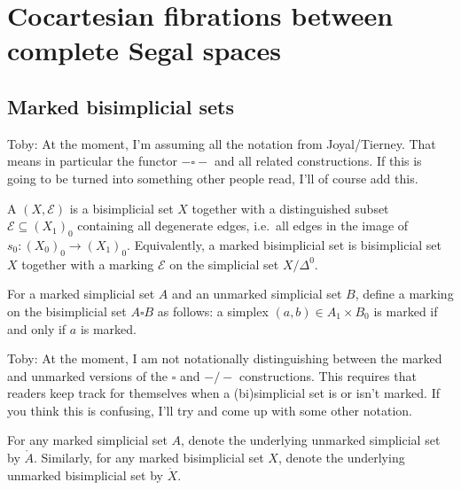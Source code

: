 \documentclass[main.tex]{subfiles}
\begin{document}
\section{Cocartesian fibrations between complete Segal spaces}
\label{sec:cocartesian_fibrations_between_complete_segal_spaces}

\subsection{Marked bisimplicial sets}
\label{ssc:marked_bisimplicial_sets}

\begin{note}
  Toby: At the moment, I'm assuming all the notation from Joyal/Tierney. That means in particular the functor $-\square-$ and all related constructions. If this is going to be turned into something other people read, I'll of course add this.
\end{note}

\begin{definition}
  A  $(X, \mathcal{E})$ is a bisimplicial set $X$ together with a distinguished subset $\mathcal{E} \subseteq (X_{1})_{0}$ containing all degenerate edges, i.e.\ all edges in the image of $s_{0}\colon (X_{0})_{0} \to (X_{1})_{0}$. Equivalently, a marked bisimplicial set is bisimplicial set $X$ together with a marking $\mathcal{E}$ on the simplicial set $X / \Delta^{0}$.
\end{definition}

\begin{definition}
  For a marked simplicial set $A$ and an unmarked simplicial set $B$, define a marking on the bisimplicial set $A \square B$ as follows: a simplex $(a, b) \in A_{1} \times B_{0}$ is marked if and only if $a$ is marked.
\end{definition}

\begin{note}
  Toby: At the moment, I am not notationally distinguishing between the marked and unmarked versions of the $\square$ and $-/-$ constructions. This requires that readers keep track for themselves when a (bi)simplicial set is or isn't marked. If you think this is confusing, I'll try and come up with some other notation.
\end{note}

For any marked simplicial set $A$, denote the underlying unmarked simplicial set by $\mathring{A}$. Similarly, for any marked bisimplicial set $X$, denote the underlying unmarked bisimplicial set by $\mathring{X}$.
\end{document}
